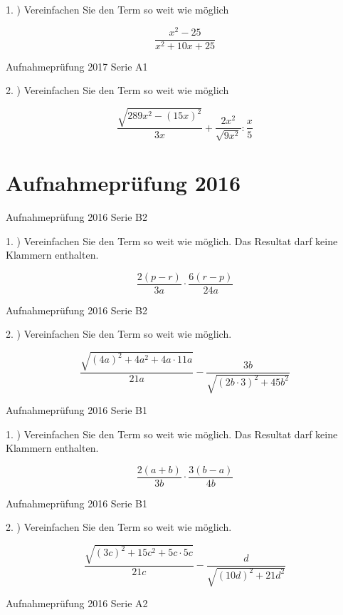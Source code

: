 1. ) Vereinfachen Sie den Term so weit wie möglich

$$\frac{x^2-25}{x^2+10x+25}$$

Aufnahmeprüfung 2017 Serie A1

2. ) Vereinfachen Sie den Term so weit wie möglich

$$\frac{\sqrt{289x^2 - (15x)^2}}{3x} + \frac{2x^2}{\sqrt{9x^2}} : \frac{x}5$$

\section*{Aufnahmeprüfung 2016}
Aufnahmeprüfung 2016 Serie B2

1. ) Vereinfachen Sie den Term so weit wie möglich. Das Resultat darf
keine Klammern enthalten.

$$ \frac{2(p-r)}{3a} \cdot{} \frac{6(r-p)}{24a}$$


Aufnahmeprüfung 2016 Serie B2

2. ) Vereinfachen Sie den Term so weit wie möglich.

$$\frac{\sqrt{(4a)^2+4a^2+4a\cdot{}11a}}{21a} - \frac{3b}{\sqrt{(2b\cdot{}3)^2+45b^2}}$$


Aufnahmeprüfung 2016 Serie B1

1. ) Vereinfachen Sie den Term so weit wie möglich. Das Resultat darf
keine Klammern enthalten.

$$\frac{2(a+b)}{3b} \cdot{} \frac{3(b-a)}{4b}$$


Aufnahmeprüfung 2016 Serie B1

2. ) Vereinfachen Sie den Term so weit wie möglich. 

$$\frac{\sqrt{(3c)^2+15c^2+5c\cdot{}5c}}{21c} - \frac{d}{\sqrt{(10d)^2 + 21d^2}}$$


Aufnahmeprüfung 2016 Serie A2

